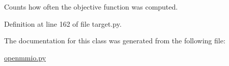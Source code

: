 Counts how often the objective function was computed. 



Definition at line 162 of file target.\-py.



The documentation for this class was generated from the following file\-:\begin{DoxyCompactItemize}
\item 
\hyperlink{openmmio_8py}{openmmio.\-py}\end{DoxyCompactItemize}
